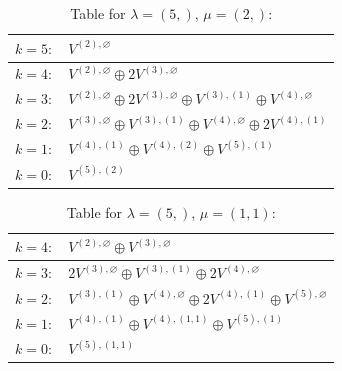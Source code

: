 \documentclass[a4paper,12pt]{article}
\begin{document}
\renewcommand{\arraystretch}{1.6} 
\begin{table}[H]
\centering
\caption{Table for $\lambda = (5,)$, $\mu = (2,)$:}
\begin{tabular}{|>{\centering\arraybackslash}p{15cm}|}
\hline
 $k = 5: \quad V^{(2), \varnothing} $ \\ \hline
 $k = 4: \quad V^{(2), \varnothing} \oplus 2 V^{(3), \varnothing} $ \\ \hline
 $k = 3: \quad V^{(2), \varnothing} \oplus 2 V^{(3), \varnothing} \oplus V^{(3), (1)} \oplus V^{(4), \varnothing} $ \\ \hline
 $k = 2: \quad V^{(3), \varnothing} \oplus V^{(3), (1)} \oplus V^{(4), \varnothing} \oplus 2 V^{(4), (1)} $ \\ \hline
 $k = 1: \quad V^{(4), (1)} \oplus V^{(4), (2)} \oplus V^{(5), (1)} $ \\ \hline
 $k = 0: \quad V^{(5), (2)} $ \\ \hline
\end{tabular}
\end{table}

\renewcommand{\arraystretch}{1.6} 
\begin{table}[H]
\centering
\caption{Table for $\lambda = (5,)$, $\mu = (1, 1)$:}
\begin{tabular}{|>{\centering\arraybackslash}p{15cm}|}
\hline
 $k = 4: \quad V^{(2), \varnothing} \oplus V^{(3), \varnothing} $ \\ \hline
 $k = 3: \quad 2 V^{(3), \varnothing} \oplus V^{(3), (1)} \oplus 2 V^{(4), \varnothing} $ \\ \hline
 $k = 2: \quad V^{(3), (1)} \oplus V^{(4), \varnothing} \oplus 2 V^{(4), (1)} \oplus V^{(5), \varnothing} $ \\ \hline
 $k = 1: \quad V^{(4), (1)} \oplus V^{(4), (1, 1)} \oplus V^{(5), (1)} $ \\ \hline
 $k = 0: \quad V^{(5), (1, 1)} $ \\ \hline
\end{tabular}
\end{table}
\end{document}
